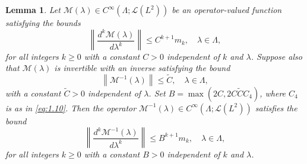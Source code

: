 \documentclass[11pt]{amsart}
\newtheorem{lemma}[Theorem]{Lemma}
\numberwithin{equation}{section}
\begin{document}
\begin{lemma}  \label{3.2} 
Let $\mathcal{M}(\lambda)\in C^\infty(\Lambda;\mathcal{L}(L^2))$ be an operator-valued function 
satisfying the bounds
\begin{equation}\label{eq:3.5}
\left\|\frac{d^k\mathcal{M}(\lambda)}{d\lambda^k}\right\|\le C^{k+1}m_k,\quad\lambda\in\Lambda,
\end{equation}
for all integers $k\ge 0$ with a constant $C>0$ independent of $k$ and $\lambda$. Suppose also that $\mathcal{M}(\lambda)$ is invertible 
with an inverse satisfying the bound
\begin{equation}\label{eq:3.6}
\left\|\mathcal{M}^{-1}(\lambda)\right\|\le \widetilde C,\quad\lambda\in\Lambda,
\end{equation}
 with a constant $\widetilde C>0$ independent of $\lambda$. Set $B = \max(2C, 2C \tilde C C_4)$, where $C_4$ is as in \eqref{eq:1.10}. Then the operator $\mathcal{M}^{-1}(\lambda) \in C^\infty(\Lambda;\mathcal{L}(L^2))$
satisfies the bound
\begin{equation}\label{eq:3.7}
\left\|\frac{d^k\mathcal{M}^{-1}(\lambda)}{d\lambda^k}\right\|\le B^{k+1}m_k,\quad\lambda\in\Lambda,
\end{equation}
for all integers $k\ge 0$ with a constant $B>0$ independent of $k$ and $\lambda$. 
\end{lemma}
\end{document}

